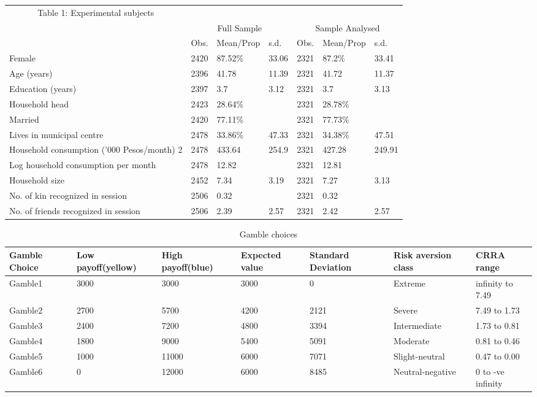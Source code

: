 \documentclass[]{elsarticle} %
\begin{document}
\begin{table}[!h]
\centering\begingroup\fontsize{8}{10}\selectfont

\begin{tabular}{lrllrll}
\toprule
\multicolumn{1}{c}{Table 1: Experimental subjects} \\
\cmidrule(l{3pt}r{3pt}){1-1}
\multicolumn{1}{c}{ } & \multicolumn{3}{c}{Full Sample} & \multicolumn{3}{c}{Sample Analysed} \\
\cmidrule(l{3pt}r{3pt}){2-4} \cmidrule(l{3pt}r{3pt}){5-7}
  & Obs. & Mean/Prop & s.d. & Obs. & Mean/Prop & s.d.\\
\midrule
Female & 2420 & 87.52\% & 33.06 & 2321 & 87.2\% & 33.41\\
Age (years) & 2396 & 41.78 & 11.39 & 2321 & 41.72 & 11.37\\
Education (years) & 2397 & 3.7 & 3.12 & 2321 & 3.7 & 3.13\\
Household head & 2423 & 28.64\% &  & 2321 & 28.78\% & \\
Married & 2420 & 77.11\% &  & 2321 & 77.73\% & \\
\addlinespace
Lives in municipal centre & 2478 & 33.86\% & 47.33 & 2321 & 34.38\% & 47.51\\
Household consumption ('000 Pesos/month) 2 & 2478 & 433.64 & 254.9 & 2321 & 427.28 & 249.91\\
Log household consumption per month & 2478 & 12.82 &  & 2321 & 12.81 & \\
Household size & 2452 & 7.34 & 3.19 & 2321 & 7.27 & 3.13\\
No. of kin recognized in session & 2506 & 0.32 &  & 2321 & 0.32 & \\
\addlinespace
No. of friends recognized in session & 2506 & 2.39 & 2.57 & 2321 & 2.42 & 2.57\\
\bottomrule
\end{tabular}
\endgroup{}
\end{table}

\begin{table}[!h]

\caption{\label{tab:table 2}Gamble choices}
\centering
\fontsize{6}{8}\selectfont
\begin{tabular}{lllllll}
\toprule
Gamble Choice & Low payoff(yellow) & High payoff(blue) & Expected value & Standard Deviation & Risk aversion class & CRRA range\\
\midrule
Gamble1 & 3000 & 3000 & 3000 & 0 & Extreme & infinity to 7.49\\
Gamble2 & 2700 & 5700 & 4200 & 2121 & Severe & 7.49 to 1.73\\
Gamble3 & 2400 & 7200 & 4800 & 3394 & Intermediate & 1.73 to 0.81\\
Gamble4 & 1800 & 9000 & 5400 & 5091 & Moderate & 0.81 to 0.46\\
Gamble5 & 1000 & 11000 & 6000 & 7071 & Slight-neutral & 0.47 to 0.00\\
\addlinespace
Gamble6 & 0 & 12000 & 6000 & 8485 & Neutral-negative & 0 to -ve infinity\\
\bottomrule
\end{tabular}
\end{table}
\end{document}
